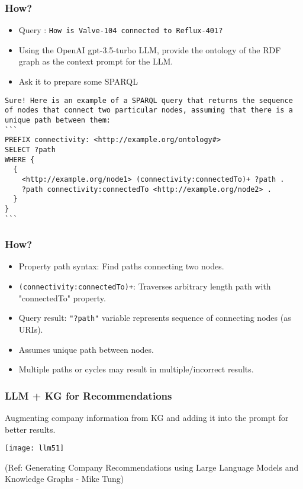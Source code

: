 \begin{frame}[fragile]\frametitle{How?}

\begin{itemize}
\item Query : \lstinline|How is Valve-104 connected to Reflux-401?|
\item Using the OpenAI gpt-3.5-turbo LLM, provide the ontology of the RDF graph as the context prompt for the LLM.
\item Ask it to prepare some SPARQL
\end{itemize}	

\begin{lstlisting}
Sure! Here is an example of a SPARQL query that returns the sequence of nodes that connect two particular nodes, assuming that there is a unique path between them:
```
PREFIX connectivity: <http://example.org/ontology#>
SELECT ?path
WHERE {
  {
    <http://example.org/node1> (connectivity:connectedTo)+ ?path .
    ?path connectivity:connectedTo <http://example.org/node2> .
  }
}
```
\end{lstlisting}

\end{frame}

\begin{frame}[fragile]\frametitle{How?}

\begin{itemize}
\item Property path syntax: Find paths connecting two nodes.
\item \lstinline|(connectivity:connectedTo)+|: Traverses arbitrary length path with "connectedTo" property.
\item Query result: \lstinline|"?path"| variable represents sequence of connecting nodes (as URIs).
\item Assumes unique path between nodes.
\item Multiple paths or cycles may result in multiple/incorrect results.
\end{itemize}	

\end{frame}

\begin{frame}[fragile]\frametitle{LLM + KG for Recommendations}

Augmenting company information from KG and adding it into the prompt for better results.

\begin{center}
\texttt{[image: llm51]}
\end{center}	

{\tiny (Ref: Generating Company Recommendations using Large Language Models and Knowledge Graphs - Mike Tung)}

\end{frame}

